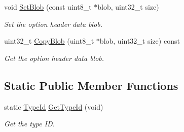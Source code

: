 \begin{DoxyCompactItemize}
void \hyperlink{classns3_1_1SixLowPanNhcExtension_ab755b0e76375beba7f56b29ee56c6ad6}{Set\+Blob} (const uint8\+\_\+t $\ast$blob, uint32\+\_\+t size)
\begin{DoxyCompactList}\small\item\em Set the option header data blob. \end{DoxyCompactList}\item 
uint32\+\_\+t \hyperlink{classns3_1_1SixLowPanNhcExtension_a021f33c461cc28afc3da25960656cb48}{Copy\+Blob} (uint8\+\_\+t $\ast$blob, uint32\+\_\+t size) const 
\begin{DoxyCompactList}\small\item\em Get the option header data blob. \end{DoxyCompactList}\end{DoxyCompactItemize}
\subsection*{Static Public Member Functions}
\begin{DoxyCompactItemize}
\item 
static \hyperlink{classns3_1_1TypeId}{Type\+Id} \hyperlink{classns3_1_1SixLowPanNhcExtension_a7bb60d0edb5d208bda80e5be36bad447}{Get\+Type\+Id} (void)
\begin{DoxyCompactList}\small\item\em Get the type ID. \end{DoxyCompactList}\end{DoxyCompactItemize}
